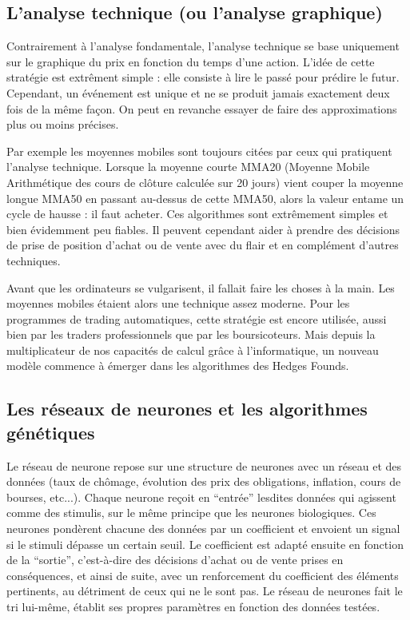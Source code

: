 \documentclass[a4paper,12pt]{article}
\begin{document}
\subsection{L'analyse technique (ou l'analyse graphique)}
Contrairement à l'analyse fondamentale, l'analyse technique se base uniquement sur le graphique du prix en fonction du temps d'une action. L'idée de cette stratégie est extrêment simple : elle consiste à lire le passé pour prédire le futur. Cependant, un événement est unique et ne se produit jamais exactement deux fois de la même façon. On peut en revanche essayer de faire des approximations plus ou moins précises. 

Par exemple les moyennes mobiles sont toujours citées par ceux qui pratiquent l'analyse technique. Lorsque la moyenne courte MMA20 (Moyenne Mobile Arithmétique des cours de clôture calculée sur 20 jours) vient couper la moyenne longue MMA50 en passant au-dessus de cette MMA50, alors la valeur entame un cycle de hausse : il faut acheter. Ces algorithmes sont extrêmement simples et bien évidemment peu fiables. Il peuvent cependant aider à prendre des décisions de prise de position d'achat ou de vente avec du flair et en complément d'autres techniques. 

Avant que les ordinateurs se vulgarisent, il fallait faire les choses à la main. Les moyennes mobiles étaient alors une technique assez moderne. Pour les programmes de trading automatiques, cette stratégie est encore utilisée, aussi bien par les traders professionnels que par les boursicoteurs. Mais depuis la multiplicateur de nos capacités de calcul grâce à l'informatique, un nouveau modèle commence à émerger dans les algorithmes des Hedges Founds.

\subsection{Les réseaux de neurones et les algorithmes génétiques}

Le réseau de neurone repose sur une structure de neurones avec un réseau et des données (taux de chômage, évolution des prix des obligations, inflation, cours de bourses, etc...). Chaque neurone reçoit en “entrée” lesdites données qui agissent comme des stimulis, sur le même principe que les neurones biologiques. Ces neurones pondèrent chacune des données par un coefficient et envoient un signal si le stimuli dépasse un certain seuil. Le coefficient est adapté ensuite en fonction de la “sortie”, c’est-à-dire des décisions d’achat ou de vente prises en conséquences, et ainsi de suite, avec un renforcement du coefficient des éléments pertinents, au détriment de ceux qui ne le sont pas. Le réseau de neurones fait le tri lui-même, établit ses propres paramètres en fonction des données testées.
\end{document}
